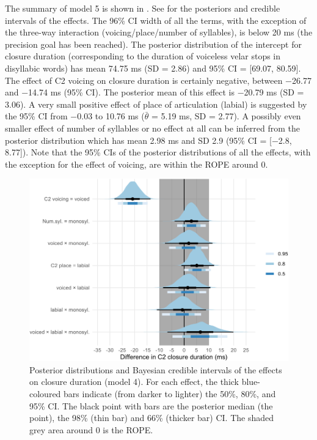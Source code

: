 \documentclass[12pt,a4paper,]{article}
\begin{document}
The summary of model 5 is shown in . See
 for the posteriors and credible intervals of
the effects. The 96\% CI width of all the terms, with the exception of
the three-way interaction (voicing/place/number of syllables), is below
20 ms (the precision goal has been reached). The posterior distribution
of the intercept for closure duration (corresponding to the duration of
voiceless velar stops in disyllabic words) has mean 74.75 ms (SD = 2.86)
and 95\% CI = {[}69.07, 80.59{]}. The effect of C2 voicing on closure
duration is certainly negative, between −26.77 and −14.74 ms (95\% CI).
The posterior mean of this effect is −20.79 ms (SD = 3.06). A very small
positive effect of place of articulation (labial) is suggested by the
95\% CI from −0.03 to 10.76 ms (\(\bar{\theta}\) = 5.19 ms, SD = 2.77).
A possibly even smaller effect of number of syllables or no effect at
all can be inferred from the posterior distribution which has mean 2.98
ms and SD 2.9 (95\% CI = {[}−2.8, 8.77{]}). Note that the 95\% CIs of
the posterior distributions of all the effects, with the exception for
the effect of voicing, are within the ROPE around 0.

\begin{figure}
\includegraphics[width=\linewidth]{2019-english-rr_files/figure-latex/clos-5-intervals-1} \caption{Posterior distributions and Bayesian credible intervals of the effects on closure duration (model 4). For each effect, the thick blue-coloured bars indicate (from darker to lighter) the 50\%, 80\%, and 95\% CI. The black point with bars are the posterior median (the point), the 98\% (thin bar) and 66\% (thicker bar) CI. The shaded grey area around 0 is the ROPE.}\label{f:clos-5-intervals}
\end{figure}
\end{document}
